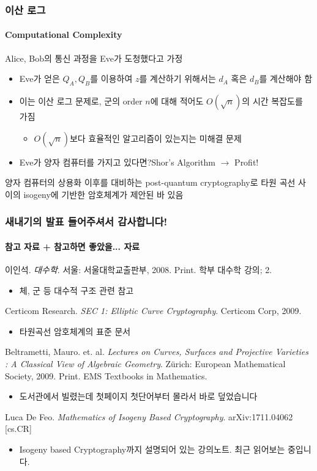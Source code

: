 \documentclass[aspectratio=169,mathserif]{beamer}
\begin{document}
  \begin{frame}
    \frametitle{이산 로그}
    \framesubtitle{Computational Complexity}

    Alice, Bob의 통신 과정을 Eve가 도청했다고 가정
    \pause
    \begin{itemize}
      \item Eve가 얻은 \(Q_A, Q_B\)를 이용하여 \(z\)를 계산하기 위해서는 \(d_A\) 혹은 \(d_B\)를 계산해야 함
      \item 이는 이산 로그 문제로, 군의 order \(n\)에 대해 적어도 \(O(\sqrt{n})\)의 시간 복잡도를 가짐
      \pause
      \begin{itemize}
        \item \(O(\sqrt{n})\)보다 효율적인 알고리즘이 있는지는 미해결 문제
      \end{itemize}
      \pause
      \item Eve가 양자 컴퓨터를 가지고 있다면?\pause\quad Shor's Algorithm \(\rightarrow\) Profit!
    \end{itemize}
    \pause
    양자 컴퓨터의 상용화 이후를 대비하는 post-quantum cryptography로 타원 곡선 사이의 isogeny에 기반한 암호체계가 제안된 바 있음
  \end{frame}

  \begin{frame}
    \frametitle{새내기의 발표 들어주셔서 감사합니다!}
    \framesubtitle{참고 자료 + 참고하면 좋았을... 자료}

    이인석. {\it 대수학}. 서울: 서울대학교출판부, 2008. Print. 학부 대수학 강의; 2.
    \begin{itemize}
      \item 체, 군 등 대수적 구조 관련 참고
    \end{itemize}
    Certicom Research. {\it SEC 1: Elliptic Curve Cryptography}. Certicom Corp, 2009.
    \begin{itemize}
      \item 타원곡선 암호체계의 표준 문서
    \end{itemize}
    Beltrametti, Mauro. et. al. {\it Lectures on Curves, Surfaces and Projective Varieties : A Classical View of Algebraic Geometry}. Zürich: European Mathematical Society, 2009. Print. EMS Textbooks in Mathematics.
    \begin{itemize}
      \item 도서관에서 빌렸는데 첫페이지 첫단어부터 몰라서 바로 덮었습니다
    \end{itemize}
    Luca De Feo. {\it Mathematics of Isogeny Based Cryptography}. arXiv:1711.04062 [cs.CR]
    \begin{itemize}
      \item Isogeny based Cryptography까지 설명되어 있는 강의노트. 최근 읽어보는 중입니다.
    \end{itemize}
  \end{frame}
\end{document}
